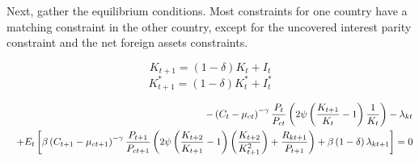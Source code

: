 \documentclass{article}
\begin{document}
Next, gather the equilibrium conditions. Most constraints for one country
have a matching constraint in the other country, except for the uncovered
interest parity constraint and the net foreign assets constraints.

\bigskip 
\[
K_{t+1}=\left( 1-\delta \right) K_{t}+I_{t} 
\]%
\[
K_{t+1}^{\ast }=\left( 1-\delta \right) K_{t}^{\ast }+I_{t}^{\ast } 
\]

\begin{eqnarray}
&&-\left( C_{t}-\mu _{ct}\right) ^{-\gamma }\frac{P_{t}}{P_{ct}}\left( 2\psi
\left( \frac{K_{t+1}}{K_{t}}-1\right) \frac{1}{K_{t}}\right) -\lambda _{kt} 
\nonumber \\
&&+E_{t}\left[ \beta \left( C_{t+1}-\mu _{ct+1}\right) ^{-\gamma }\frac{%
P_{t+1}}{P_{ct+1}}\left( 2\psi \left( \frac{K_{t+2}}{K_{t+1}}-1\right)
\left( \frac{K_{t+2}}{K_{t+1}^{2}}\right) +\frac{R_{kt+1}}{P_{t+1}}\right)
+\beta \left( 1-\delta \right) \lambda _{kt+1}\right] =0
\end{eqnarray}
\end{document}
